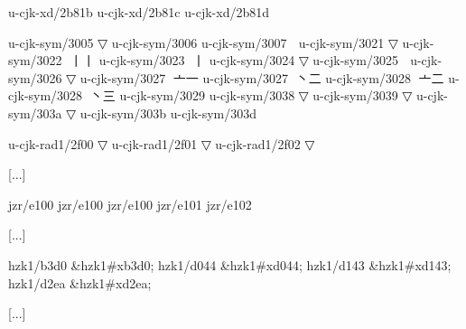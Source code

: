 \begin{multicols}{2}
[...] 
 
u-cjk-xd/2b81b	{	} 
u-cjk-xd/2b81c	{	} 
u-cjk-xd/2b81d	{	} 
 
u-cjk-sym/3005	{	}▽ 
u-cjk-sym/3006	{	} 
u-cjk-sym/3007	{\cjk{}}	{\cnxJzr{}\cjkgGlue} 
u-cjk-sym/3021	{	}▽ 
u-cjk-sym/3022	{\cjk{}}	{\cnxJzr{}\cjkgGlue}{\cjk{}丨丨} 
u-cjk-sym/3023	{\cjk{}}	{\cnxJzr{}\cjkgGlue}{丨} 
u-cjk-sym/3024	{	}▽ 
u-cjk-sym/3025	{\cjk{}}	{\cnxJzr{}\cjkgGlue} 
u-cjk-sym/3026	{	}▽ 
u-cjk-sym/3027	{\cjk{}}	{\cnxJzr{}\cjkgGlue}{\cjk{}亠一} 
u-cjk-sym/3027	{\cjk{}}	{\cnxJzr{}\cjkgGlue}{\cjk{}丶二} 
u-cjk-sym/3028	{\cjk{}}	{\cnxJzr{}\cjkgGlue}{\cjk{}亠二} 
u-cjk-sym/3028	{\cjk{}}	{\cnxJzr{}\cjkgGlue}{\cjk{}丶三} 
u-cjk-sym/3029	{	} 
u-cjk-sym/3038	{	}▽ 
u-cjk-sym/3039	{	}▽ 
u-cjk-sym/303a	{	}▽ 
u-cjk-sym/303b	{	} 
u-cjk-sym/303d	{\cjk{}}	{\cnxJzr{}\cjkgGlue} 
 
u-cjk-rad1/2f00	{	}▽ 
u-cjk-rad1/2f01	{	}▽ 
u-cjk-rad1/2f02	{	}▽ 
 
[...] 
 
jzr/e100	{	} 
jzr/e100	{	} 
jzr/e100	{	} 
jzr/e101	{	} 
jzr/e102	{	} 
 
[...] 
 
hzk1/b3d0	\&hzk1\#xb3d0;	 
hzk1/d044	\&hzk1\#xd044;	 
hzk1/d143	\&hzk1\#xd143;	 
hzk1/d2ea	\&hzk1\#xd2ea;	 
 
[...] 
\endgroup{}{}

\endgroup{}\end{multicols}\null\newpage{}\begin{multicols}{2}\end{multicols}
